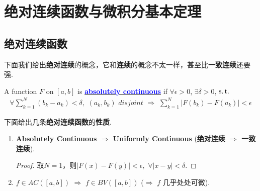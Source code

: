 \newpage
\section{绝对连续函数与微积分基本定理}
\subsection{绝对连续函数}
	下面我们给出\textbf{绝对连续}的概念，它和\textbf{连续}的概念不太一样，甚至比\textbf{一致连续}还要强.
	\begin{defn}\label{def 4.7.1}
		A function $F$ on $[a , b]$ is \underline{\textcolor{blue}{\textbf{absolutely continuous}}} if $\forall \epsilon > 0$, $\exists \delta > 0$, $\operatorname{s.t.}$
		\begin{align}
			\forall \sum_{k = 1}^{N}{(b_k - a_k)} < \delta , \,\, (a_k , b_k) \,\, disjoint \,\, 
			\Rightarrow \,\, \sum_{k = 1}^{N}{\left| F(b_k) - F(a_k) \right|} < \epsilon
		\end{align}
		
		\vspace{2em}
		\begin{rmk}
			下面给出几条\textbf{绝对连续函数}的\textbf{性质}.
			\begin{enumerate}
				\item \textbf{Absolutely Continuous $\Rightarrow$ Uniformly Continuous} (\textbf{绝对连续 $\Rightarrow$ 一致连续}).
				
				\vspace{1em}
				\begin{proof}
					取$N = 1$，则$\left| F(x) - F(y) \right| < \epsilon , \,\, \forall \left| x - y \right| < \delta$.
				\end{proof}
				
				\vspace{8em}
				
				\item $f \in AC([a , b]) \,\, \Rightarrow \,\, f \in BV([a , b])$ ($\Rightarrow$ $f$ 几乎处处可微).
				

\end{enumerate}
\end{rmk}
\end{defn}
